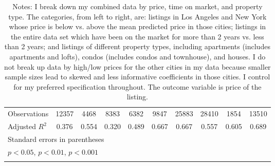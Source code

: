 \begin{sidewaystable}
{\begin{longtable}{l*{9}{c}}
\hline
Observations        &       12357         &        4468         &        8383         &        6382         &        9847         &       25883         &       28410         &        1854         &       13510         \\
Adjusted \(R^{2}\)  &       0.376         &       0.554         &       0.320         &       0.489         &       0.667         &       0.667         &       0.557         &       0.605         &       0.689         \\
\hline\hline
\multicolumn{10}{l}{\footnotesize Standard errors in parentheses}\\
\multicolumn{10}{l}{\footnotesize \sym{*} \(p<0.05\), \sym{**} \(p<0.01\), \sym{***} \(p<0.001\)}\\
\caption*{Notes: I break down my combined data by price, time on market, and property type. The categories, from left to right, are: listings in Los Angeles and New York whose price is below vs. above the mean predicted price in those cities; listings in the entire data set which have been on the market for more than 2 years vs. less than 2 years; and listings of different property types, including apartments (includes apartments and lofts), condos (includes condos and townhouse), and houses. I do not break up data by high/low prices for the other cities in my data because smaller sample sizes lead to skewed and less informative coefficients in those cities. I control for my preferred specification throughout. The outcome variable is price of the listing.}\\
\end{longtable}
}

\end{sidewaystable}

